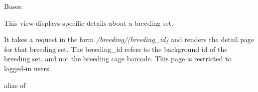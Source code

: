 \documentclass[letterpaper,10pt,english]{sphinxmanual}
\begin{document}

\begin{fulllineitems}
\label{api:mousedb.animal.views.BreedingDetail}
Bases: {\hyperref[api:mousedb.views.ProtectedDetailView]{}}

This view displays specific details about a breeding set.

It takes a request in the form \emph{/breeding/(breeding\_id)} and renders the detail page for that breeding set.
The breeding\_id refers to the background id of the breeding set, and not the breeding cage barcode.
This page is restricted to logged-in users.

\begin{fulllineitems}
\label{api:mousedb.animal.views.BreedingDetail.context_object_name}
\end{fulllineitems}


\begin{fulllineitems}
\label{api:mousedb.animal.views.BreedingDetail.model}
alias of 

\end{fulllineitems}


\begin{fulllineitems}
\label{api:mousedb.animal.views.BreedingDetail.template_name}
\end{fulllineitems}


\end{fulllineitems}

\end{document}
